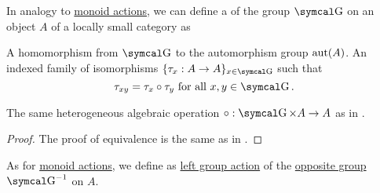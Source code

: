 \begin{definition}\label{def:left_group_action}
  In analogy to \hyperref[def:left_monoid_action]{monoid actions}, we can define a  of the group \( \CG \) on an object \( A \) of a locally small category as
  \begin{DefEnum}
     A homomorphism from \( \CG \) to the automorphism group \( \operatorname{aut}(A) \).
     An indexed family of isomorphisms \( \{ \tau_x: A \to A \}_{x \in \CG} \) such that
    \begin{equation}\label{eq:def:left_group_action/indirect_homomorphism}
      \tau_{xy} = \tau_x \circ \tau_y \Tforall x, y \in \CG.
    \end{equation}

     The same heterogeneous algebraic operation \( \circ: \CG \times A \to A \) as in .
  \end{DefEnum}
\end{definition}
\begin{proof}
  The proof of equivalence is the same as in .
\end{proof}

\begin{definition}\label{def:right_group_action}
  As for \hyperref[def:right_monoid_action]{monoid actions}, we define  as \hyperref[def:left_group_action]{left group action} of the \hyperref[def:magma/opposite]{opposite group} \( \CG^{-1} \) on \( A \).
\end{definition}
